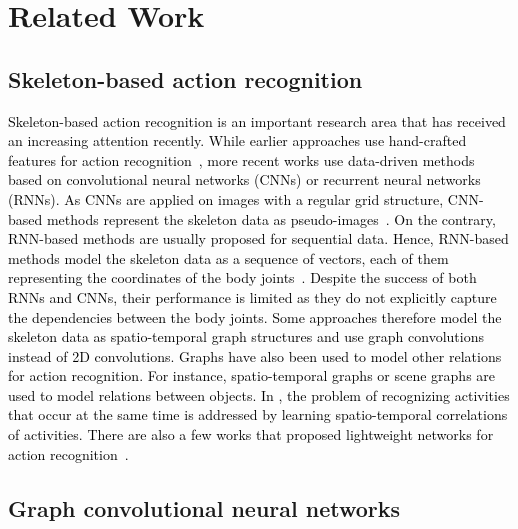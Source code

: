 \documentclass[letterpaper, 10 pt, conference]{ieeeconf}
\newcommand{\todo}[1]{{\textcolor{black}{#1}}}
\begin{document}
\section{Related Work}
\label{sec:rel}

\subsection{Skeleton-based action recognition}

\todo{Skeleton-based action recognition is an important research area that has received an increasing attention recently.
While earlier approaches use hand-crafted features for action recognition~\cite{YaoGG12,6751508,vemulapalli2014human,fernando2015modeling}, more recent works use data-driven methods based on convolutional neural networks (CNNs) or recurrent neural networks (RNNs).
As CNNs are applied on images with a regular grid structure, CNN-based methods represent the skeleton data as pseudo-images~\cite{ke2017new, kim2017interpretable,li2017skeleton}. 
On the contrary, RNN-based methods are usually proposed for sequential data. Hence, RNN-based methods model the skeleton data as a sequence of vectors, each of them representing the coordinates of the body joints~\cite{shahroudy2016ntu, liu2016spatio, zhang2017view, zheng2018skeleton, li2018independently, cao2018skeleton}. 
Despite the success of both RNNs and CNNs, their performance is limited as they do not explicitly capture the dependencies between the body joints. 
Some approaches \cite{yan2018spatial,li2019actional,shi2019two} therefore model the skeleton data as spatio-temporal graph structures and use graph convolutions instead of 2D convolutions. Graphs have also been used to model other relations for action recognition. For instance, spatio-temporal graphs \cite{liu2020learning} or scene graphs \cite{dreher2019learning} are used to model relations between objects. In \cite{weiexplainable}, the problem of recognizing activities that occur at the same time is addressed by learning spatio-temporal correlations of activities. There are also a few works that proposed lightweight networks for action recognition~\cite{liu2020gfnet,zhang2019eleatt,yang2019make}.
}




 
\subsection{Graph convolutional neural networks}
\end{document}
